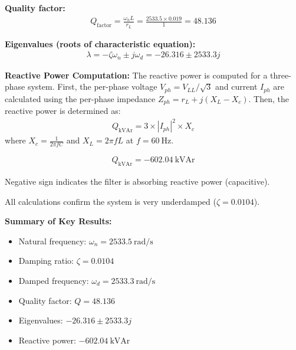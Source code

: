 \textbf{Quality factor:}
\begin{align*}
	Q_{\text{factor}} = \frac{\omega_n L}{r_L} = \frac{2533.5 \times 0.019}{1} = 48.136
\end{align*}

\textbf{Eigenvalues (roots of characteristic equation):}
\begin{align*}
	\lambda = -\zeta \omega_n \pm j \omega_d = -26.316 \pm 2533.3j
\end{align*}

\textbf{Reactive Power Computation:}
The reactive power is computed for a three-phase system. First, the per-phase voltage $V_{ph} = V_{LL}/\sqrt{3}$ and current $I_{ph}$ are calculated using the per-phase impedance $Z_{ph}=r_L + j(X_L - X_c)$. Then, the reactive power is determined as:
\begin{align*}
    Q_{\text{kVAr}} = 3 \times |I_{ph}|^2 \times X_c
\end{align*}
where $X_c = \frac{1}{2 \pi f C}$ and $X_L = 2 \pi f L$ at $f = 60~\text{Hz}$.


\begin{align*}
	Q_{\text{kVAr}} = -602.04~\text{kVAr}
\end{align*}

Negative sign indicates the filter is absorbing reactive power (capacitive).

All calculations confirm the system is very underdamped ($\zeta = 0.0104$).

\vspace{1em}
	\textbf{Summary of Key Results:}
\begin{itemize}
	\item Natural frequency: $\boxed{\omega_n = 2533.5~\text{rad/s}}$
	\item Damping ratio: $\boxed{\zeta = 0.0104}$
	\item Damped frequency: $\boxed{\omega_d = 2533.3~\text{rad/s}}$
	\item Quality factor: $\boxed{Q = 48.136}$
	\item Eigenvalues: $\boxed{-26.316 \pm 2533.3j}$
	\item Reactive power: $\boxed{-602.04~\text{kVAr}}$
\end{itemize}


